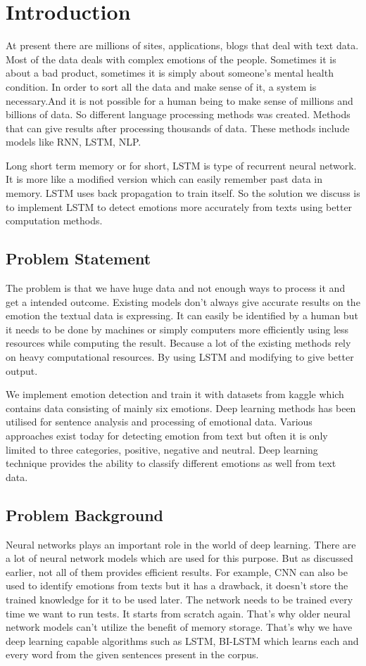 \chapter{Introduction}\label{intro}
 At present there are millions of sites, applications, blogs that deal with text data. Most of the data deals with complex emotions of the people. Sometimes it is about a bad product, sometimes it is simply about someone's mental health condition. In order to sort all the data and make sense of it, a system is necessary.And it is not possible for a human being to make sense of millions and billions of data. So different language processing methods was created. Methods that can give results after processing thousands of data. These methods include models like RNN, LSTM, NLP.

Long short term memory or for short, LSTM is type of recurrent neural network. It is more like a modified version which can easily remember past data in memory. LSTM uses back propagation to train itself. So the solution we discuss is to implement LSTM to detect emotions more accurately from texts using better computation methods. 

\section{Problem Statement}
The problem is that we have huge data and not enough ways to process it and get a intended outcome. Existing models don't always give accurate results on the emotion the textual data is expressing. It can easily be identified by a human but it needs to be done by machines or simply computers more efficiently using less resources while computing the result. Because a lot of the existing methods rely on heavy computational resources. By using LSTM and modifying to give better output. 

We implement emotion detection and train it with datasets from kaggle which contains data consisting of mainly six emotions. Deep learning methods has been utilised for sentence analysis and processing of emotional data. Various approaches exist today for detecting emotion from text but often it is only limited to three categories, positive, negative and neutral. Deep learning technique provides the ability to classify different emotions as well from text data.
\section{Problem Background}
Neural networks plays an important role in the world of deep learning. There are a lot of neural network models which are used for this purpose. But as discussed earlier, not all of them provides efficient results. For example, CNN can also be used to identify emotions from texts but it has a drawback, it doesn't store the trained knowledge for it to be used later. The network needs to be trained every time we want to run tests. It starts from scratch again. That's why older neural network models can't utilize the benefit of memory storage. That's why we have deep learning capable algorithms such as LSTM, BI-LSTM which learns each and every word from the given sentences present in the corpus.   

